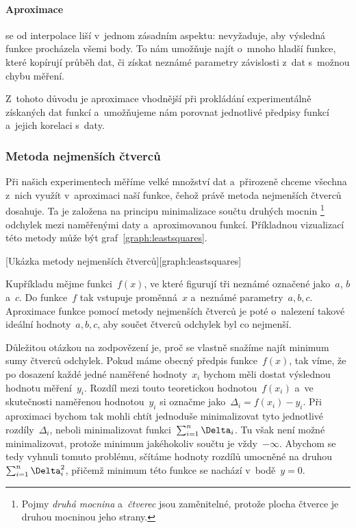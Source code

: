 \paragraph{Aproximace} se od interpolace liší v~jednom zásadním aspektu:
nevyžaduje, aby výsledná funkce procházela všemi body. To nám umožňuje najít
o~mnoho hladší funkce, které kopírují průběh dat, či získat neznámé parametry
závislosti z~dat s~možnou chybu měření. 

Z~tohoto důvodu je aproximace vhodnější při prokládání experimentálně získaných
dat funkcí a~umožňujeme nám porovnat jednotlivé předpisy funkcí a~jejich
korelaci s~daty.

\subsubsection{Metoda nejmenších čtverců}
\label{sec:čtverce}
Při našich experimentech měříme velké množství dat a~přirozeně chceme všechna
z~nich využít v~aproximaci naší funkce, čehož právě metoda nejmenších čtverců
dosahuje. Ta je založena na principu minimalizace součtu druhých mocnin%
\footnote{Pojmy \emph{druhá mocnina} a~\emph{čtverec} jsou zaměnitelné, protože
plocha čtverce je druhou mocninou jeho strany.} odchylek mezi naměřenými daty
a~aproximovanou funkcí. Příkladnou vizualizací této metody může být
graf~\ref{graph:leastsquares}.

[Ukázka metody nejmenších čtverců][graph:leastsquares]

Kupříkladu mějme funkci~$f(x)$, ve které figurují 
tři neznámé označené jako~$a$, $b$ a~$c$. Do funkce~$f$ tak vstupuje
proměnná~$x$ a~neznámé parametry~$a,b,c$. Aproximace funkce pomocí metody
nejmenších čtverců je poté o~nalezení takové ideální hodnoty~$a,b,c$,
aby součet čtverců odchylek byl co nejmenší.

Důležitou otázkou na zodpovězení je, proč se vlastně snažíme najít minimum sumy
čtverců odchylek. Pokud máme obecný předpis funkce~$f(x)$, tak víme, že po
dosazení každé jedné naměřené hodnoty~$x_i$ bychom měli dostat výslednou
hodnotu měření~$y_i$. Rozdíl mezi touto teoretickou hodnotou~$f(x_i)$ a~ve
skutečnosti naměřenou hodnotou~$y_i$ si označme jako~$\Delta_i = f(x_i)-y_i$.
Při aproximaci bychom tak mohli chtít jednoduše minimalizovat tyto jednotlivé
rozdíly~$\Delta_i$, neboli minimalizovat funkci~$\nsum \Delta_i$. Tu však není
možné minimalizovat, protože minimum jakéhokoliv součtu je vždy~$-\infty$.
Abychom se tedy vyhnuli tomuto problému, sčítáme hodnoty rozdílů umocněné na
druhou~$\nsum \Delta_i^2$, přičemž minimum této funkce se nachází
v~bodě~$y=0$.~\cite{praktikum}

